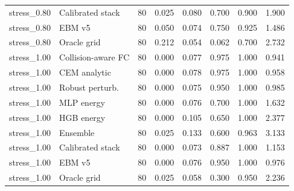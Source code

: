 {\begin{longtable}{llrrrrrr}
stress\_0.80 & Calibrated stack & 80 & 0.025 & 0.080 & 0.700 & 0.900 & 1.900 \\
stress\_0.80 & EBM v5 & 80 & 0.050 & 0.074 & 0.750 & 0.925 & 1.486 \\
stress\_0.80 & Oracle grid & 80 & 0.212 & 0.054 & 0.062 & 0.700 & 2.732 \\
stress\_1.00 & Collision-aware FC & 80 & 0.000 & 0.077 & 0.975 & 1.000 & 0.941 \\
stress\_1.00 & CEM analytic & 80 & 0.000 & 0.078 & 0.975 & 1.000 & 0.958 \\
stress\_1.00 & Robust perturb. & 80 & 0.000 & 0.075 & 0.950 & 1.000 & 0.985 \\
stress\_1.00 & MLP energy & 80 & 0.000 & 0.076 & 0.700 & 1.000 & 1.632 \\
stress\_1.00 & HGB energy & 80 & 0.000 & 0.105 & 0.650 & 1.000 & 2.377 \\
stress\_1.00 & Ensemble & 80 & 0.025 & 0.133 & 0.600 & 0.963 & 3.133 \\
stress\_1.00 & Calibrated stack & 80 & 0.000 & 0.073 & 0.887 & 1.000 & 1.153 \\
stress\_1.00 & EBM v5 & 80 & 0.000 & 0.076 & 0.950 & 1.000 & 0.976 \\
stress\_1.00 & Oracle grid & 80 & 0.025 & 0.058 & 0.300 & 0.950 & 2.236 \\
\bottomrule
\end{longtable}
}
